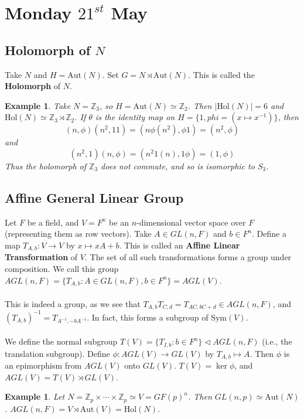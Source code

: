 \documentclass[a4paper,10pt]{article}
\newcommand{\ZZ}{\mathbb{Z}}
\newtheorem{eg}[thm]{Example}
\begin{document}
\newpage
\section{Monday $21^{st}$ May}

\subsection{Holomorph of $N$}
Take $N$ and $H = \text{Aut}(N)$. Set $G = N \rtimes \text{Aut}(N)$. This is called the \textbf{Holomorph} of $N$. 

\begin{eg}
Take $N = \ZZ_3$, so $H = \text{Aut}(N) \simeq \ZZ_2$. Then $|\text{Hol}(N)| = 6$ and $\text{Hol}(N) \simeq \ZZ_3 \rtimes \ZZ_2$. If $\theta$ is the identity map on $H = \{ 1, phi = (x \mapsto x^{-1}) \}$, then
\[ (n, \phi) (n^2, 11) = ( n \phi (n^2), \phi 1) = (n^2, \phi) \]
and
\[ (n^2, 1)(n, \phi) = (n^2 1(n), 1 \phi) = (1, \phi) \]
Thus the holomorph of $\ZZ_3$ does not commute, and so is isomorphic to $S_3$. 
\end{eg}


\subsection{Affine General Linear Group}

Let $F$ be a field, and $V = F^n$ be an $n$-dimensional vector space over $F$ (representing them as row vectors). Take $A \in GL(n,F)$ and $b \in F^n$. Define a map $T_{A,b} : V \rightarrow V$ by $x \mapsto xA + b$. This is called an \textbf{Affine Linear Transformation} of $V$. The set of all such transformations forms a group under composition. We call this group $AGL(n,F) = \{ T_{A,b} : A \in GL(n,F), b \in F^n \} = AGL(V)$. \\
\\
This is indeed a group, as we see that $T_{A,b} T_{C,d} = T_{AC, bC + d} \in AGL(n,F)$, and $(T_{A,b})^{-1} = T_{A^{-1}, -bA^{-1}}$. In fact, this forms a subgroup of $\text{Sym}(V)$. \\
\\
We define the normal subgroup $T(V) = \{ T_{I,b} : b \in F^n \} \triangleleft AGL(n,F)$ (i.e., the translation subgroup). Define $\phi : AGL(V) \rightarrow GL(V)$ by $T_{A,b} \mapsto A$. Then $\phi$ is an epimorphism from $AGL(V)$ onto $GL(V)$. $T(V) = \ker \phi$, and $AGL(V) = T(V) \rtimes GL(V)$. 


\begin{eg}
Let $N = \ZZ_p \times \cdots \times \ZZ_p \simeq V = GF(p)^n$. Then $GL(n,p) \simeq \text{Aut}(N)$. $AGL(n,F) = V \rtimes \text{Aut}(V) = \text{Hol}(N)$.
\end{eg}
\end{document}
